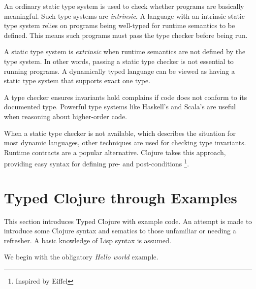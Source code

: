 An ordinary static type system is used to check whether programs are basically
meaningful. Such type systems are \emph{intrinsic}. A language with an intrinsic
static type system relies on programs being well-typed for runtime semantics to be defined.
This means such programs must pass the type checker before being run.

A static type system is \emph{extrinsic} when runtime semantics
are not defined by the type system. In other words, passing a static type checker
is not essential to running programs. A dynamically typed language can be viewed
as having a static type system that supports exact one type.

A type checker ensures invariants hold complains if code
does not conform to its documented type. Powerful type systems like
Haskell's and Scala's are useful when reasoning about higher-order code.

When a static type checker is not available, which describes the situation
for most dynamic languages, other techniques are used for checking
type invariants. Runtime contracts are a popular alternative.
Clojure takes this approach, providing easy syntax for defining pre-
and post-conditions \footnote{Inspired by Eiffel}.



\section{Typed Clojure through Examples}

This section introduces Typed Clojure with example code. An attempt is
made to introduce some Clojure syntax and sematics to those unfamiliar or needing a refresher.
A basic knowledge of Lisp syntax is assumed.

We begin with the obligatory \emph{Hello world} example.

